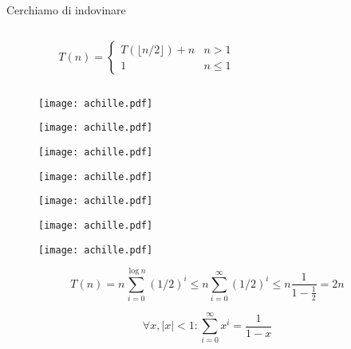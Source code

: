 \begin{frame}[shrink=5]{Cerchiamo di indovinare}

\vspace{-6pt}
\begin{mybox}
\begin{columns}[c]
\begin{column}{0.46\textwidth}
\[
T(n) = \begin{cases}
      T( \lfloor n/2 \rfloor )  + n & n > 1 \\
     1 & n \leq 1
  \end{cases}
\]
\end{column}
\begin{column}{0.51\textwidth}
\end{column}
\end{columns}
\end{mybox}


\begin{overprint}
\begin{figure}
	\texttt{[image: achille.pdf]}
\end{figure}
\begin{figure}
	\texttt{[image: achille.pdf]}
\end{figure}
\begin{figure}
	\texttt{[image: achille.pdf]}
\end{figure}
\begin{figure}
	\texttt{[image: achille.pdf]}
\end{figure}
\begin{figure}
	\texttt{[image: achille.pdf]}
\end{figure}
\begin{figure}
	\texttt{[image: achille.pdf]}
\end{figure}
\begin{figure}
	\texttt{[image: achille.pdf]}
\end{figure}
\[
  T(n) =    {n \sum_{i=0}^{ \log n } (1/2)^i}
       \leq {n \sum_{i=0}^{\infty} (1/2)^i}
       \leq {n \frac{1}{1-\frac{1}{2}} = 2n}
\]

\begin{myboxtitle}
\[
 \forall x, |x|<1: \sum_{i=0}^{\infty} x^i = \frac{1}{1-x}
\]
\end{myboxtitle}
\end{overprint}
\end{frame}






